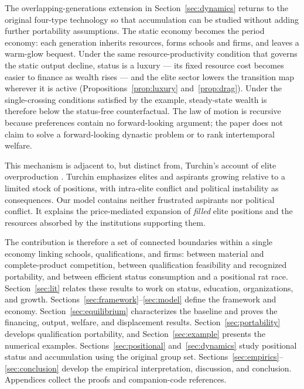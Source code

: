\documentclass[12pt,letterpaper]{article}
\theoremstyle{definition}
\begin{document}
The overlapping-generations extension in Section~\ref{sec:dynamics} returns to the
original four-type technology so that accumulation can be studied without adding further
portability assumptions.
The static economy becomes the period economy: each generation inherits resources, forms
schools and firms, and leaves a warm-glow bequest.
Under the same resource-productivity condition that governs the static output decline,
status is a luxury --- its fixed resource cost becomes easier to finance as wealth rises
--- and the elite sector lowers the transition map wherever it is active
(Propositions~\ref{prop:luxury} and~\ref{prop:drag}).
Under the single-crossing conditions satisfied by the example, steady-state wealth is
therefore below the status-free counterfactual.
The law of motion is recursive because preferences contain no forward-looking argument;
the paper does not claim to solve a forward-looking dynastic problem or to rank
intertemporal welfare.

This mechanism is adjacent to, but distinct from, Turchin's account of elite
overproduction \citep{turchin2023endtimes}.
Turchin emphasizes elites and aspirants growing relative to a limited stock of positions,
with intra-elite conflict and political instability as consequences.
Our model contains neither frustrated aspirants nor political conflict.
It explains the price-mediated expansion of \emph{filled} elite positions and the
resources absorbed by the institutions supporting them.

The contribution is therefore a set of connected boundaries within a single economy
linking schools, qualifications, and firms: between material and complete-product competition,
between qualification feasibility and recognized portability, and between efficient
status consumption and a positional rat race.
Section~\ref{sec:lit} relates these results to work on status, education, organizations,
and growth.
Sections~\ref{sec:framework}--\ref{sec:model} define the framework and economy.
Section~\ref{sec:equilibrium} characterizes the baseline and proves the financing,
output, welfare, and displacement results.
Section~\ref{sec:portability} develops qualification portability, and
Section~\ref{sec:example} presents the numerical examples.
Sections~\ref{sec:positional} and~\ref{sec:dynamics} study positional status and
accumulation using the original group set.
Sections~\ref{sec:empirics}--\ref{sec:conclusion} develop the empirical interpretation,
discussion, and conclusion.
Appendices collect the proofs and companion-code references.
\end{document}

